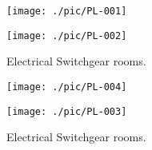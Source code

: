 \documentclass[justified, 11pt, a4paper]{tufte-book}
\begin{document}
\newpage



\begin{fullwidth}
\begin{figure*}[btp]
\texttt{[image: ./pic/PL-001]}
\vspace*{1pt}

\texttt{[image: ./pic/PL-002]}
\vspace*{1pt}

\caption{Electrical Switchgear rooms.}
\end{figure*}
\end{fullwidth}

\newpage

\begin{fullwidth}
\begin{figure*}[btp]
\texttt{[image: ./pic/PL-004]}
\vspace*{1pt}

\texttt{[image: ./pic/PL-003]}
\vspace*{1pt}

\caption{Electrical Switchgear rooms.}
\end{figure*}
\end{fullwidth}
\end{document}
